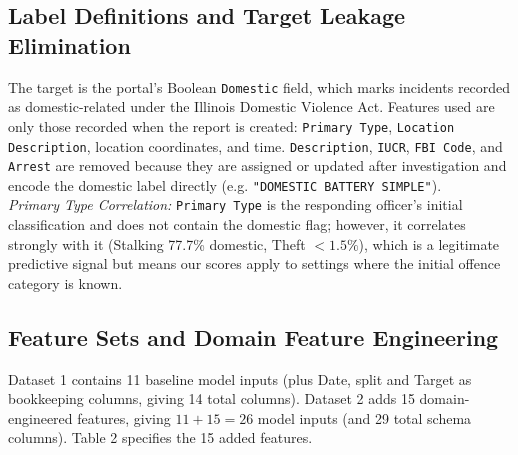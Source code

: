 \documentclass[runningheads]{llncs}
\begin{document}
\subsection{Label Definitions and Target Leakage Elimination}
The target is the portal's Boolean \texttt{Domestic} field, which marks incidents recorded as domestic-related under the Illinois Domestic Violence Act. Features used are only those recorded when the report is created: \texttt{Primary Type}, \texttt{Location Description}, location coordinates, and time. \texttt{Description}, \texttt{IUCR}, \texttt{FBI Code}, and \texttt{Arrest} are removed because they are assigned or updated after investigation and encode the domestic label directly (e.g. \texttt{"DOMESTIC BATTERY SIMPLE"}).\\
\textit{Primary Type Correlation:} \texttt{Primary Type} is the responding officer's initial classification and does not contain the domestic flag; however, it correlates strongly with it (Stalking 77.7\% domestic, Theft $<1.5\%$), which is a legitimate predictive signal but means our scores apply to settings where the initial offence category is known.

\subsection{Feature Sets and Domain Feature Engineering}
Dataset 1 contains 11 baseline model inputs (plus Date, split and Target as bookkeeping columns, giving 14 total columns). Dataset 2 adds 15 domain-engineered features, giving $11 + 15 = 26$ model inputs (and 29 total schema columns). Table 2 specifies the 15 added features.
\end{document}
